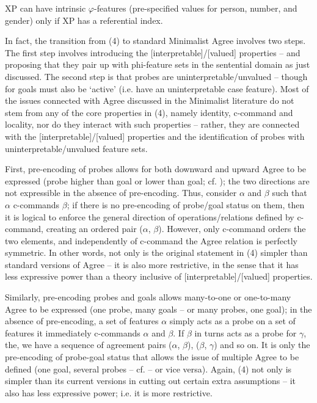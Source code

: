 \documentclass[output=paper]{langsci/langscibook}
\begin{document}
\ea%
    \label{ex:manzini:5}
    XP can have intrinsic $\varphi $-features (pre-specified values for person, number, and gender) only if XP has a referential index.
    \z

           

In fact, the transition from (4) to standard Minimalist Agree involves two steps. The first step involves introducing the [interpretable]/[valued] properties – and proposing that they pair up with phi-feature sets in the sentential domain as just discussed. The second step is that probes are uninterpretable/unvalued – though for \citet{Chomsky2001} goals must also be ‘active’ (i.e. have an uninterpretable case feature). Most of the issues connected with Agree discussed in the Minimalist literature do not stem from any of the core properties in (4), namely identity, c-command and locality, nor do they interact with such properties – rather, they are connected with the [interpretable]/[valued] properties and the identification of probes with uninterpretable/unvalued feature sets. 

First, pre-encoding of probes allows for both downward and upward Agree to be expressed (probe higher than goal or lower than goal; cf. \citealt{Zeijlstra2012}); the two directions are not expressible in the absence of pre-encoding. Thus, consider $\alpha $ and $\beta $ such that $\alpha $ c-commands $\beta $; if there is no pre-encoding of probe/goal status on them, then it is logical to enforce the general direction of operations/relations defined by c-command, creating an ordered pair ($\alpha $, $\beta $). However, only c-command orders the two elements, and independently of c-command the Agree relation is perfectly symmetric. In other words, not only is the original statement in (4) simpler than standard versions of Agree – it is also more restrictive, in the sense that it has less expressive power than a theory inclusive of [interpretable]/[valued] properties.

Similarly, pre-encoding probes and goals allows many-to-one or one-to-many Agree to be expressed (one probe, many goals – or many probes, one goal); in the absence of pre-encoding, a set of features $\alpha $ simply acts as a probe on a set of features it immediately c-commands $\alpha $ and $\beta $. If $\beta $ in turns acts as a probe for $\gamma $, the, we have a sequence of agreement pairs ($\alpha $, $\beta $), ($\beta $, $\gamma $) and so on. It is only the pre-encoding of probe-goal status that allows the issue of multiple Agree to be defined (one goal, several probes – cf. \citealt{Carstens2001} – or vice versa). Again, (4) not only is simpler than its current versions in cutting out certain extra assumptions – it also has less expressive power; i.e. it is more restrictive.
\end{document}
